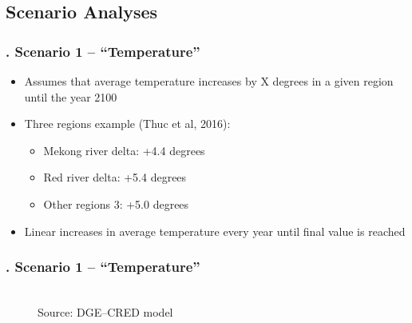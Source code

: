 \documentclass[11pt,aspectratio=169]{beamer}
\begin{document}
\subsection{Scenario Analyses}
\begin{frame}
\frametitle{{\thesection.\thesubsection} Scenario 1 -- "`Temperature"'}
\begin{itemize}
\item Assumes that average temperature increases by X degrees in a given region until the year 2100
\item Three regions example (Thuc et al, 2016):
	\begin{itemize}
		\item Mekong river delta: +4.4 degrees
		\item Red river delta: +5.4 degrees
		\item Other regions 3: +5.0 degrees
	\end{itemize}
 \item Linear increases in average temperature every year until final value is reached
\end{itemize}
\end{frame}

\begin{frame}
\frametitle{{\thesection.\thesubsection} Scenario 1 -- "`Temperature"'}
\begin{figure}
			\centering
			\\
			\footnotesize{Source: DGE--CRED model}
		\end{figure}
\end{frame}
\end{document}
